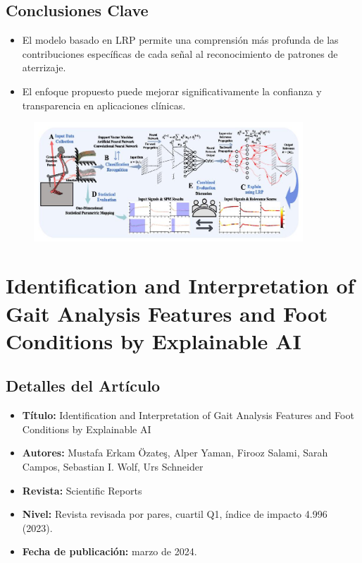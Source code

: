 \documentclass{report}
\begin{document}
\subsection{Conclusiones Clave}
\begin{itemize}
    \item El modelo basado en LRP permite una comprensión más profunda de las contribuciones específicas de cada señal al reconocimiento de patrones de aterrizaje.
    \item El enfoque propuesto puede mejorar significativamente la confianza y transparencia en aplicaciones clínicas.
\end{itemize}

\begin{figure}[H] 
    \centering
    \includegraphics[width=0.9\textwidth]{Images/Xu.jpg}
\end{figure}


\section{Identification and Interpretation of Gait Analysis Features and Foot Conditions by Explainable AI}

\subsection{Detalles del Artículo}
\begin{itemize} 
    \item \textbf{Título:} Identification and Interpretation of Gait Analysis Features and Foot Conditions by Explainable AI
    \item \textbf{Autores:} Mustafa Erkam Özateş, Alper Yaman, Firooz Salami, Sarah Campos, Sebastian I. Wolf, Urs Schneider
    \item \textbf{Revista:} Scientific Reports
    \item \textbf{Nivel:} Revista revisada por pares, cuartil Q1, índice de impacto 4.996 (2023).
    \item \textbf{Fecha de publicación:} marzo de 2024.
\end{itemize}
\end{document}

